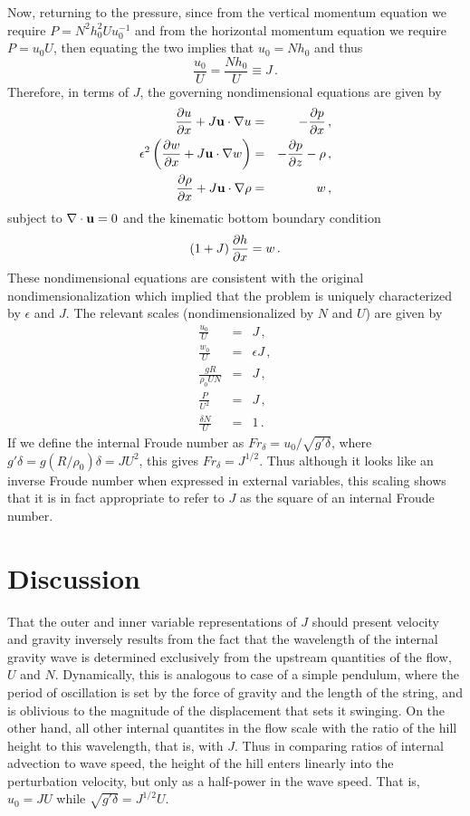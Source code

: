 \documentclass[12pt]{article}
\begin{document}
	Now, returning to the pressure, since from the vertical momentum equation we
	require $P = N^2h_0^2U u_0^{-1}$ and from the horizontal momentum equation we require $P = u_0 U$, then equating the
	two implies that $u_0 = N h_0$ and thus
	\[
	\frac{u_0}{U} = \frac{N h_0}{U} \equiv J\,.
	\] 
	Therefore, in terms of $J$, the governing nondimensional equations are given by
	\begin{eqnarray*}
		\frac{\partial{u}}{\partial{x}} + J\mathbf{u}\cdot\nabla u &=& -\frac{\partial{p}}{\partial{x}}\,,\\
		\epsilon^2 \left(\frac{\partial{w}}{\partial{x}} + J\mathbf{u}\cdot\nabla w\right) &=& -\frac{\partial{p}}{\partial{z}} - \rho\,,\\
		\frac{\partial{\rho}}{\partial{x}} + J \mathbf{u}\cdot\nabla\rho &=& w\,,
	\end{eqnarray*}
	subject to $\nabla\cdot\mathbf{u}=0$ and the kinematic bottom boundary condition
	\[
	\left(1 + J \right)\frac{\partial{h}}{\partial{x}} = w\,.
	\]
	These nondimensional equations are consistent with the original nondimensionalization which implied
	that the problem is uniquely characterized by $\epsilon$ and $J$.
	The relevant scales (nondimensionalized by $N$ and $U$) are given by
	\begin{eqnarray*}
		\frac{u_0}{U} &=& J\,,\\
		\frac{w_0}{U} &=& \epsilon J\,,\\
		\frac{gR}{\rho_0 U N} &=& J\,,\\
		\frac{P}{U^2} &=& J\,,\\
		\frac{\delta N}{U} &=& 1\,.
	\end{eqnarray*}
	If we define the internal Froude number as
	$Fr_\delta = u_0/\sqrt{g' \delta}$, where $g'\delta =g (R/\rho_0) \delta = J U^2$, this gives
	$Fr_{\delta} = J^{1/2}$. Thus although it looks like an inverse Froude number when expressed in external variables, this scaling shows that it is
	in fact appropriate to refer to $J$ as the square of an internal Froude number. 
	
	\section{Discussion}
	
	That the outer and inner variable representations of $J$ should present velocity and gravity inversely results from the fact that the wavelength of the internal gravity wave is determined exclusively from the upstream quantities of the flow, $U$ and $N$. Dynamically, this is analogous to case of a simple pendulum, where the period of oscillation is set by the force of gravity and the length of the string, and is oblivious to the magnitude of the displacement that sets it swinging.  On the other hand, all other internal quantites in the flow scale with the ratio of the hill height to this wavelength, that is, with $J$. Thus in comparing ratios of internal advection to wave speed, the height of the hill enters linearly into the perturbation velocity, but only as a half-power in the wave speed. That is, $u_0=JU$ while $\sqrt{g'\delta} = J^{1/2} U$.  
	
\end{document}
